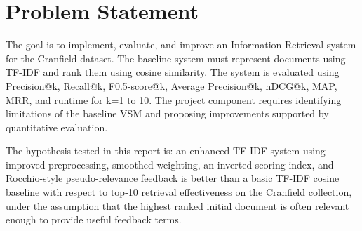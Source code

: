 \section{Problem Statement}\label{sec:prob_stat}
The goal is to implement, evaluate, and improve an Information Retrieval system for the Cranfield dataset. 
The baseline system must represent documents using TF-IDF and rank them using cosine similarity. 
The system is evaluated using Precision@k, Recall@k, F0.5-score@k, Average Precision@k, nDCG@k, MAP, MRR, and runtime for k=1 to 10. 
The project component requires identifying limitations of the baseline VSM and proposing improvements supported by quantitative evaluation.

The hypothesis tested in this report is: an enhanced TF-IDF system using improved preprocessing, smoothed weighting,
an inverted scoring index, and Rocchio-style pseudo-relevance feedback is better than a basic TF-IDF cosine baseline
with respect to top-10 retrieval effectiveness on the Cranfield collection, under the assumption that the highest
ranked initial document is often relevant enough to provide useful feedback terms.
